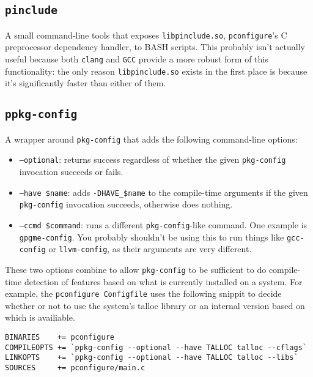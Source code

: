 \documentclass{article}
\newcommand{\pconfigure}{\texttt{pconfigure}}
\begin{document}
\subsection{\texttt{pinclude} \label{prog:pinclude}}

A small command-line tools that exposes \texttt{libpinclude.so},
\pconfigure's C preprocessor dependency handler, to BASH scripts.
This probably isn't actually useful because both \texttt{clang} and
\texttt{GCC} provide a more robust form of this functionality: the
only reason \texttt{libpinclude.so} exists in the first place is
because it's significantly faster than either of them.

\subsection{\texttt{ppkg-config} \label{prog:ppkg-config}}

A wrapper around \texttt{pkg-config} that adds the following
command-line options:

\begin{itemize}
\item \texttt{--optional}: returns success regardless of whether the
  given \texttt{pkg-config} invocation succeeds or fails.
\item \texttt{--have \$name}: adds \texttt{-DHAVE\_\$name} to the
  compile-time arguments if the given \texttt{pkg-config} invocation
  succeeds, otherwise does nothing.
\item \texttt{--ccmd \$command}: runs a different
  \texttt{pkg-config}-like command.  One example is
  \texttt{gpgme-config}.  You probably shouldn't be using this to run
  things like \texttt{gcc-config} or \texttt{llvm-config}, as their
  arguments are very different.
\end{itemize}

These two options combine to allow \texttt{pkg-config} to be
sufficient to do compile-time detection of features based on what is
currently installed on a system.  For example, the
\pconfigure\ \texttt{Configfile} uses the following snippit to decide
whether or not to use the system's talloc library or an internal
version based on which is availiable.

\begin{verbatim}
BINARIES    += pconfigure
COMPILEOPTS += `ppkg-config --optional --have TALLOC talloc --cflags`
LINKOPTS    += `ppkg-config --optional --have TALLOC talloc --libs`
SOURCES     += pconfigure/main.c
\end{verbatim}
\end{document}
